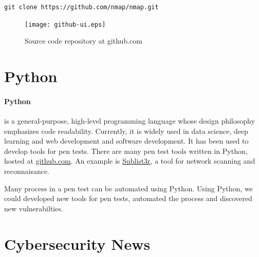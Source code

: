 \documentclass[7x9]{times}
\begin{document}
\verb|git clone https://github.com/nmap/nmap.git|



\begin{figure}
\centering
\texttt{[image: github-ui.eps]}
\caption{Source code repository at github.com}
\label{fig:github}
\end{figure}


\section{Python}

\paragraph{Python}\cite{van2007python,lutz2013learning,lutz2010programming}
is a general-purpose, high-level programming language whose design
philosophy emphasizes code readability. Currently, it is widely used
in data science, deep learning and web development and software
development. It has been used to develop tools for pen tests.  There
are many pen test tools written in Python, hosted at
\url{github.com}. An example is \url{Sublist3r}, a tool for network
scanning and reconnaisance. 


Many process in a pen test can be automated using Python. Using
Python, we could developed new tools for pen tests, automated the
process and discovered new vulnerabilties.


%

\section{Cybersecurity News}
\end{document}
